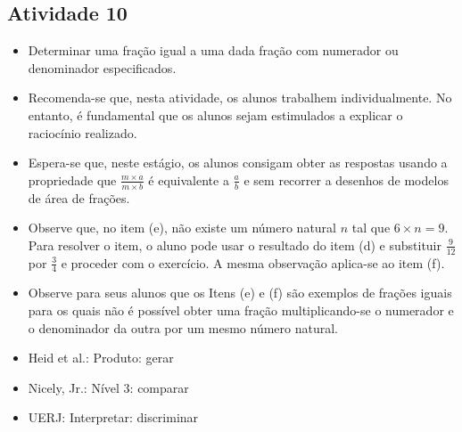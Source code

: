 \begin{multicols}{2}
\subsection{Atividade 10}

\begin{itemize} %
    \item       Determinar uma fração igual a uma dada fração com numerador ou 
denominador especificados.
\end{itemize} %
  
\begin{itemize} %
    \item       Recomenda-se que, nesta atividade, os alunos trabalhem 
individualmente. No entanto, é fundamental que os alunos sejam estimulados a 
explicar o raciocínio realizado.
    \item       Espera-se que, neste estágio, os alunos consigam obter as 
respostas usando a propriedade que       $\frac{m \times a}{m \times b}$       é 
equivalente a       $\frac{a}{b}$       e sem recorrer a desenhos de modelos de 
área de frações.
    \item       Observe que, no item (e), não existe um número natural       $n$ 
      tal que       $6 \times n = 9$. Para resolver o item, o aluno pode usar o 
resultado do item (d) e substituir       $\frac{9}{12}$       por       
$\frac{3}{4}$       e proceder com o exercício. A mesma observação aplica-se ao 
item (f).
    \item       Observe para seus alunos que os Itens (e) e (f) são exemplos de 
frações iguais para os quais não é possível obter uma fração multiplicando-se o 
numerador e o denominador da outra por um mesmo número natural.
\end{itemize} %
  
  
   \vspace{.1cm}
  
 \vspace{.1cm}
   
\begin{itemize} %
    \item       Heid et al.: Produto: gerar
    \item       Nicely, Jr.: Nível 3: comparar
    \item       UERJ: Interpretar: discriminar
\end{itemize} %
  


\end{multicols}
